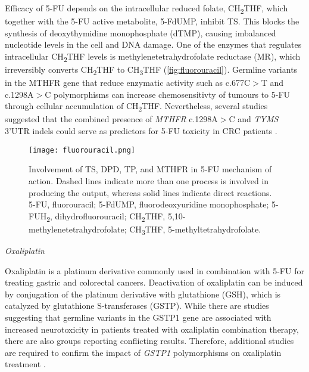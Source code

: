 Efficacy of 5-FU depends on the intracellular reduced folate, CH\textsubscript{2}THF, which together with the 5-FU active metabolite, 5-FdUMP, inhibit TS. This blocks the synthesis of deoxythymidine monophosphate (\acs{dTMP}), causing imbalanced nucleotide levels in the cell and DNA damage. One of the enzymes that regulates intracellular CH\textsubscript{2}THF levels is methylenetetrahydrofolate reductase (\acs{MR}), which irreversibly converts CH\textsubscript{2}THF to CH\textsubscript{3}THF (\autoref{fig:fluorouracil}). Germline variants in the \acs{MTHFR} gene that reduce enzymatic activity such as c.677C$>$T and c.1298A$>$C polymorphisms can increase chemosensitivty of tumours to 5-FU through cellular accumulation of CH\textsubscript{2}THF. Nevertheless, several studies suggested that the combined presence of \textit{MTHFR} c.1298A$>$C and \textit{TYMS} 3'UTR indels could serve as predictors for 5-FU toxicity in CRC patients \cite{Panczyk2014}.


\begin{figure}[H]
	\centering
	\texttt{[image: fluorouracil.png]}
	\caption[Involvement of TS, DPD, TP, and MTHFR in 5-FU mechanism of action.]{Involvement of TS, DPD, TP, and MTHFR in 5-FU mechanism of action. Dashed lines indicate more than one process is involved in producing the output, whereas solid lines indicate direct reactions. 5-FU, fluorouracil; 5-FdUMP, fluorodeoxyuridine monophosphate; 5-FUH\textsubscript{2}, dihydrofluorouracil; CH\textsubscript{2}THF, 5,10-methylenetetrahydrofolate; CH\textsubscript{3}THF, 5-methyltetrahydrofolate.}
	\label{fig:fluorouracil}
\end{figure}


\vspace{5mm}
\noindent\textit{Oxaliplatin}

Oxaliplatin is a platinum derivative commonly used in combination with 5-FU for treating gastric and colorectal cancers. Deactivation of oxaliplatin can be induced by conjugation of the platinum derivative with glutathione (GSH), which is catalyzed by glutathione S-transferases (\acs{GSTP}). While there are studies suggesting that germline variants in the \acs{GSTP1} gene are associated with increased neurotoxicity in patients treated with oxaliplatin combination therapy, there are also groups reporting conflicting results. Therefore, additional studies are required to confirm the impact of \textit{GSTP1} polymorphisms on oxaliplatin treatment \cite{Panczyk2014, Mohelnikova-Duchonova2014}.

